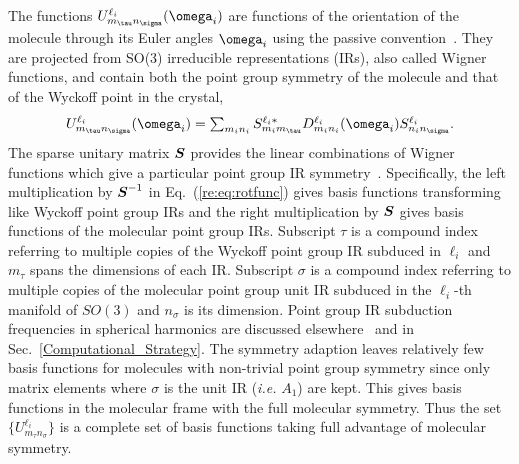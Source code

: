 \documentclass[preprint]{iucr}              %
\newcommand{\mb}[1]{\ensuremath{\mbox{\boldmath $ #1 $}}}
\begin{document}
The functions $U^{\ell_i}_{m_\tau n_\sigma}(\mb{\omega}_i)$ are functions of the
orientation of the molecule through its Euler angles $\mb{\omega}_i$
using the passive convention~\cite{Varshalovich88}.  They are
projected from SO(3) irreducible representations (IRs), also called
Wigner functions, and contain both the point group symmetry of the
molecule and that of the Wyckoff point in the crystal,
\begin{equation}
\label{re:eq:rotfunc}U^{\ell_i}_{m_\tau
n_\sigma}(\mb{\omega}_i)=\sum_{m_i n_i}S^{\ell_i*}_{m_im_\tau}D_{m_i
n_i}^{\ell_i}(\mb{\omega}_i)S^{\ell_i}_{n_in_\sigma}.
\end{equation}
The sparse unitary matrix $\mb{S}$ provides the linear combinations
of Wigner functions which give a particular point group IR
symmetry~\cite{Bradley72}.  Specifically, the left multiplication by
$\mb{S}^{-1}$ in Eq.~(\ref{re:eq:rotfunc}) gives basis functions
transforming like Wyckoff point group IRs and the right
multiplication by $\mb{S}$ gives basis functions of the molecular
point group IRs. Subscript $\tau$ is a compound index referring to
multiple copies of the Wyckoff point group IR subduced in $\ell_i$
and $m_\tau$ spans the dimensions of each IR. Subscript $\sigma$
is a compound index referring to multiple copies of the molecular
point group unit IR subduced in the $\ell_i$-th manifold of $SO(3)$
and $n_\sigma$ is its dimension. Point group IR subduction
frequencies in spherical harmonics are discussed
elsewhere~\cite{Bradley72} and in Sec.~\ref{Computational_Strategy}.
The symmetry adaption leaves relatively few basis functions for molecules with
non-trivial point group symmetry since
only matrix elements where $\sigma$ is the unit IR (\emph{i.e.}
$A_1$) are kept.  This gives basis functions in the molecular frame
with the full molecular symmetry.  Thus the set
$\{U^{\ell_i}_{m_\tau n_\sigma}\}$ is a complete set of basis functions
taking full advantage of molecular symmetry.
\end{document}
